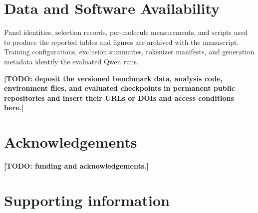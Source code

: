 \documentclass[letterpaper]{article}
\begin{document}








\section*{Data and Software Availability}

Panel identities, selection records, per-molecule measurements, and scripts used to
produce the reported tables and figures are archived with the manuscript. Training
configurations, exclusion summaries, tokenizer manifests, and generation metadata
identify the evaluated Qwen runs.

\textbf{[TODO: deposit the versioned benchmark data, analysis code, environment files,
and evaluated checkpoints in permanent public repositories and insert their URLs or
DOIs and access conditions here.]}

\section*{Acknowledgements}

\textbf{[TODO: funding and acknowledgements.]}

\section*{Supporting information}
\end{document}
